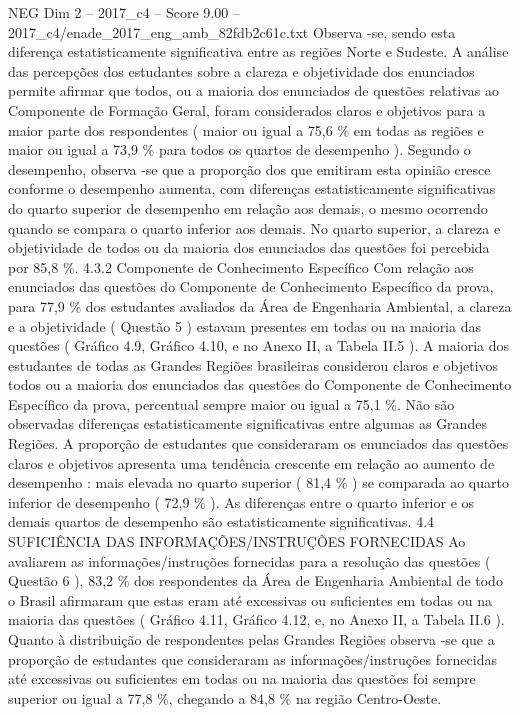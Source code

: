 \begin{textsample}{NEG Dim 2 – 2017\_c4 – Score 9.00 – 2017\_c4/enade\_2017\_eng\_amb\_82fdb2c61c.txt}
Observa -se, sendo esta diferença estatisticamente significativa entre as regiões Norte e Sudeste.
A análise das percepções dos estudantes sobre a clareza e objetividade dos enunciados permite afirmar que todos, ou a maioria dos enunciados de questões relativas ao Componente de Formação Geral, foram considerados claros e objetivos para a maior parte dos respondentes ( maior ou igual a 75,6 \% em todas as regiões e maior ou igual a 73,9 \% para todos os quartos de desempenho ).
Segundo o desempenho, observa -se que a proporção dos que emitiram esta opinião cresce conforme o desempenho aumenta, com diferenças estatisticamente significativas do quarto superior de desempenho em relação aos demais, o mesmo ocorrendo quando se compara o quarto inferior aos demais.
No quarto superior, a clareza e objetividade de todos ou da maioria dos enunciados das questões foi percebida por 85,8 \%. 4.3.2 Componente de Conhecimento Específico Com relação aos enunciados das questões do Componente de Conhecimento Específico da prova, para 77,9 \% dos estudantes avaliados da Área de Engenharia Ambiental, a clareza e a objetividade ( Questão 5 ) estavam presentes em todas ou na maioria das questões ( Gráfico 4.9, Gráfico 4.10, e no Anexo II, a Tabela II.5 ).
A maioria dos estudantes de todas as Grandes Regiões brasileiras considerou claros e objetivos todos ou a maioria dos enunciados das questões do Componente de Conhecimento Específico da prova, percentual sempre maior ou igual a 75,1 \%.
Não são observadas diferenças estatisticamente significativas entre algumas as Grandes Regiões.
A proporção de estudantes que consideraram os enunciados das questões claros e objetivos apresenta uma tendência crescente em relação ao aumento de desempenho : mais elevada no quarto superior ( 81,4 \% ) se comparada ao quarto inferior de desempenho ( 72,9 \% ).
As diferenças entre o quarto inferior e os demais quartos de desempenho são estatisticamente significativas. 4.4 SUFICIÊNCIA DAS INFORMAÇÕES/INSTRUÇÕES FORNECIDAS Ao avaliarem as informações/instruções fornecidas para a resolução das questões ( Questão 6 ), 83,2 \% dos respondentes da Área de Engenharia Ambiental de todo o Brasil afirmaram que estas eram até excessivas ou suficientes em todas ou na maioria das questões ( Gráfico 4.11, Gráfico 4.12, e, no Anexo II, a Tabela II.6 ).
Quanto à distribuição de respondentes pelas Grandes Regiões observa -se que a proporção de estudantes que consideraram as informações/instruções fornecidas até excessivas ou suficientes em todas ou na maioria das questões foi sempre superior ou igual a 77,8 \%, chegando a 84,8 \% na região Centro-Oeste.

\end{textsample}
